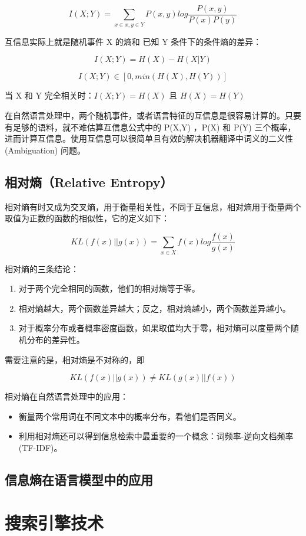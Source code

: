 \documentclass[11pt]{article}
\begin{document}
$$I(X;Y) = \sum\limits_{x\in x,y\in Y}P(x,y)log\frac{P(x,y)}{P(x)P(y)}$$

互信息实际上就是随机事件 X 的熵和 已知 Y 条件下的条件熵的差异：

$$I(X;Y) = H(X) - H(X|Y)$$

$$I(X;Y) \in [0, min(H(X), H(Y))]$$

当 X 和 Y 完全相关时：\(I(X;Y) = H(X)\) 且 \(H(X) = H(Y)\)

在自然语言处理中，两个随机事件，或者语言特征的互信息是很容易计算的。只要有足够的语料，就不难估算互信息公式中的 P(X,Y) ，P(X) 和 P(Y) 三个概率，进而计算互信息。使用互信息可以很简单且有效的解决机器翻译中词义的二义性 (Ambiguation) 问题。

\subsection{相对熵（Relative Entropy）}
\label{sec:orge503b08}
相对熵有时又成为交叉熵，用于衡量相关性，不同于互信息，相对熵用于衡量两个取值为正数的函数的相似性，它的定义如下：

$$KL(f(x)||g(x)) = \sum\limits_{x\in X}f(x)log\frac{f(x)}{g(x)}$$

相对熵的三条结论：
\begin{enumerate}
\item 对于两个完全相同的函数，他们的相对熵等于零。
\item 相对熵越大，两个函数差异越大；反之，相对熵越小，两个函数差异越小。
\item 对于概率分布或者概率密度函数，如果取值均大于零，相对熵可以度量两个随机分布的差异性。
\end{enumerate}

需要注意的是，相对熵是不对称的，即

$$KL(f(x)||g(x)) \neq KL(g(x)||f(x))$$

相对熵在自然语言处理中的应用：
\begin{itemize}
\item 衡量两个常用词在不同文本中的概率分布，看他们是否同义。
\item 利用相对熵还可以得到信息检索中最重要的一个概念：词频率-逆向文档频率 (TF-IDF)。
\end{itemize}

\subsection{信息熵在语言模型中的应用}
\label{sec:orga8a3c76}

\section{搜索引擎技术}
\label{sec:org60e0515}
\end{document}
